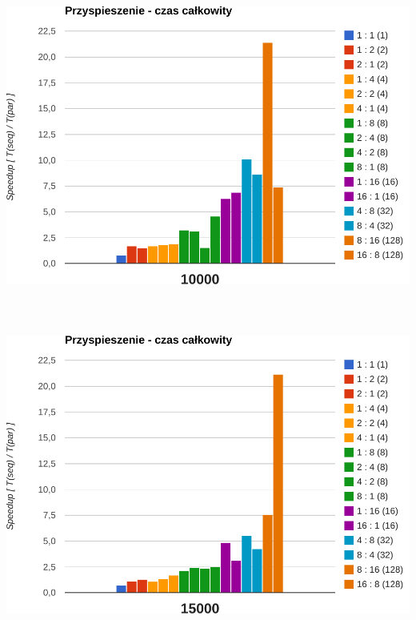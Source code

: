 \documentclass[paper=a4, fontsize=11pt]{scrartcl}	%
\numberwithin{equation}{section}		%
\numberwithin{figure}{section}			%
\numberwithin{table}{section}				%
\begin{document}
\begin{center}
\includegraphics[width=135mm]{report/speedup-10000.pdf} \\ \ \\ \ \\ \ \\

\includegraphics[width=135mm]{report/speedup-15000.pdf} \\ \ \\ \ \\ \ \\


\end{center}
\end{document}
